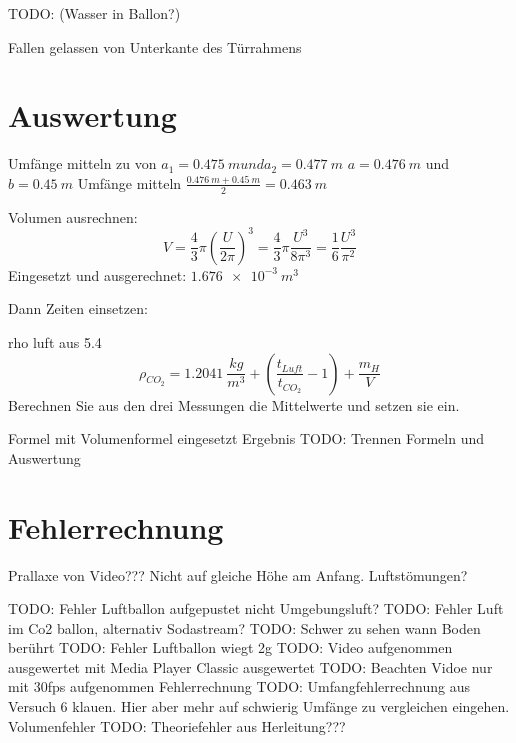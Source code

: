\documentclass{article}
\begin{document}
    TODO: (Wasser in Ballon?)
    
    Fallen gelassen von Unterkante des Türrahmens
    
    
    \section{Auswertung}
        Umfänge mitteln zu von \(a_1 = \SI{0.475}{m} und a_2 = \SI{0.477}{m} \)
        \(a = \SI{0.476}{m} \) und \(b = \SI{0.45}{m} \)
        Umfänge mitteln \( \frac{ \SI{0.476}{m} + \SI{0.45}{m} }{2} = \SI{0.463}{m} \)

        Volumen ausrechnen:
        \begin{equation} \label{eq:volumen}
            V = \frac{4}{3} \pi {\left( \frac{U}{2 \pi} \right) }^3 = \frac{4}{3} \pi \frac{U^3}{8 \pi^3} = \frac{1}{6} \frac{U^3}{\pi^2}
        \end{equation} %
        Eingesetzt und ausgerechnet:
        \( \SI{1.676e-3}{m^3} \)

        Dann Zeiten einsetzen:

        rho luft aus 5.4
        \begin{equation}
            \rho_{CO_2} = \SI{1.2041}{\frac{kg}{m^3}} + (\frac{t_{Luft}}{t_{CO_2}} - 1)+\frac{m_H}{V}
        \end{equation}
        Berechnen Sie aus den drei Messungen die Mittelwerte und setzen sie ein.

        Formel mit Volumenformel eingesetzt
        Ergebnis
    TODO: Trennen Formeln und Auswertung

    \section{Fehlerrechnung}
        Prallaxe von Video???
        Nicht auf gleiche Höhe am Anfang.
        Luftstömungen?
        
        TODO: Fehler Luftballon aufgepustet nicht Umgebungsluft?
        TODO: Fehler Luft im Co2 ballon, alternativ Sodastream?
        TODO: Schwer zu sehen wann Boden berührt
        TODO: Fehler Luftballon wiegt 2g
        TODO: Video aufgenommen ausgewertet mit Media Player Classic ausgewertet
        TODO: Beachten Vidoe nur mit 30fps aufgenommen Fehlerrechnung
        TODO: Umfangfehlerrechnung aus Versuch 6 klauen. Hier aber mehr auf schwierig Umfänge zu vergleichen eingehen. Volumenfehler
        TODO: Theoriefehler aus Herleitung???
\end{document}
